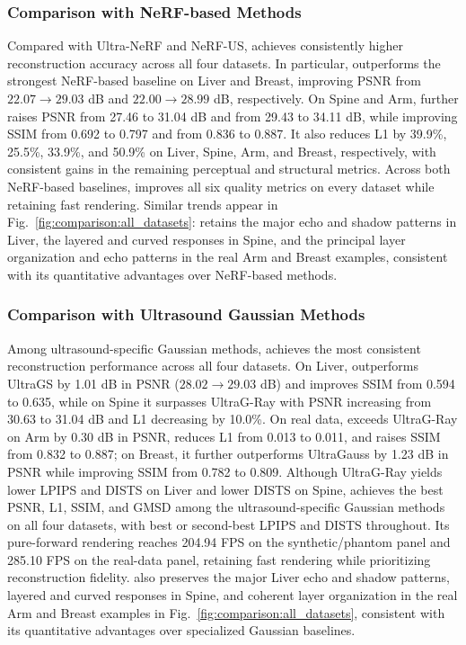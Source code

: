 \subsubsection{Comparison with NeRF-based Methods}

Compared with Ultra-NeRF and NeRF-US, \methodname{} achieves consistently
higher reconstruction accuracy across all four datasets. In particular,
\methodname{} outperforms the strongest NeRF-based baseline on Liver and
Breast, improving PSNR from $22.07\!\rightarrow\!29.03$ dB and
$22.00\!\rightarrow\!28.99$ dB, respectively. On Spine and Arm,
\methodname{} further raises PSNR from 27.46 to 31.04 dB and from 29.43 to
34.11 dB, while improving SSIM from 0.692 to 0.797 and from 0.836 to 0.887.
It also reduces L1 by 39.9\%, 25.5\%, 33.9\%, and 50.9\% on Liver, Spine,
Arm, and Breast, respectively, with consistent gains in the remaining
perceptual and structural metrics. Across both NeRF-based baselines,
\methodname{} improves all six quality metrics on every dataset while
retaining fast rendering.
Similar trends appear in Fig.~\ref{fig:comparison:all_datasets}:
\methodname{} retains the major echo and shadow patterns in Liver, the layered
and curved responses in Spine, and the principal layer organization and echo
patterns in the real Arm and Breast examples, consistent with its quantitative
advantages over NeRF-based methods.

\subsubsection{Comparison with Ultrasound Gaussian Methods}

Among ultrasound-specific Gaussian methods, \methodname{} achieves the most
consistent reconstruction performance across all four datasets. On Liver,
\methodname{} outperforms UltraGS by 1.01 dB in PSNR
($28.02\!\rightarrow\!29.03$ dB) and improves SSIM from 0.594 to 0.635,
while on Spine it surpasses UltraG-Ray with PSNR increasing from 30.63 to
31.04 dB and L1 decreasing by 10.0\%. On real data, \methodname{} exceeds
UltraG-Ray on Arm by 0.30 dB in PSNR, reduces L1 from 0.013 to 0.011, and
raises SSIM from 0.832 to 0.887; on Breast, it further outperforms UltraGauss
by 1.23 dB in PSNR while improving SSIM from 0.782 to 0.809.
Although UltraG-Ray yields lower LPIPS and DISTS on Liver and lower DISTS on
Spine, \methodname{} achieves the best PSNR, L1, SSIM, and GMSD among the
ultrasound-specific Gaussian methods on all four datasets, with best or
second-best LPIPS and DISTS throughout. Its pure-forward rendering reaches
204.94 FPS on the synthetic/phantom panel and 285.10 FPS on the real-data
panel, retaining fast rendering while prioritizing reconstruction fidelity.
\methodname{} also preserves the major Liver echo and shadow patterns,
layered and curved responses in Spine, and coherent layer organization in the
real Arm and Breast examples in Fig.~\ref{fig:comparison:all_datasets},
consistent with its quantitative advantages over specialized Gaussian
baselines.

